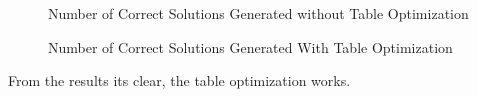 \begin{figure}[!ht] %
	\centering
	\caption{Number of Correct Solutions Generated without Table Optimization}
	\label{fig:bm7}
\end{figure}
\begin{figure}[!ht] %
	\centering
	\caption{Number of Correct Solutions Generated With Table Optimization}
	\label{fig:bm8}
\end{figure}
From the results its clear, the table optimization works.